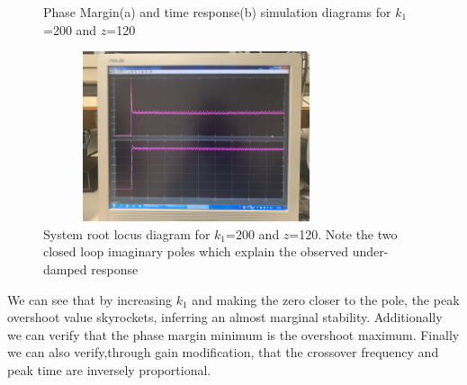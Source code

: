\documentclass[a4paper,8pt]{extarticle}
\begin{document}
        \begin{figure}[H]
            \centering
             \captionsetup{justification=centering,margin=2cm}
            \caption{Phase Margin(a) and time response(b) simulation diagrams for $k_1$=200 and $z$=120}
        \end{figure}
        \begin{figure}[H]
            \centering
             \captionsetup{justification=centering,margin=2cm}
            \includegraphics[width=9cm,height=5cm]{4_5.jpg}
            \caption{System root locus diagram for $k_1$=200 and $z$=120. Note the two closed loop imaginary poles which explain the observed under-damped response}
        \end{figure}
        
         We can see that by increasing $k_1$ and making the zero closer to the pole, the peak overshoot value skyrockets, inferring an almost marginal stability. Additionally we can verify that the phase margin minimum is the overshoot maximum.
         Finally we can also verify,through gain modification, that the crossover frequency and peak time are inversely proportional.
\end{document}
